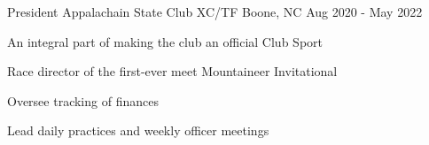 \begin{cventries}
\cventry
{President} %
{Appalachain State Club XC/TF} %
{Boone, NC} %
{Aug 2020 - May 2022} %
{
  \begin{cvitems} %
    \item {An integral part of making the club an official Club Sport}
    \item {Race director of the first-ever meet Mountaineer Invitational}
    \item {Oversee tracking of finances}
    \item {Lead daily practices and weekly officer meetings}
  \end{cvitems}
}

\end{cventries}
